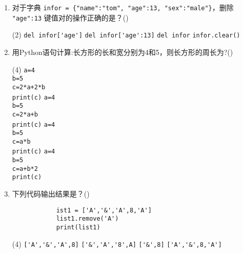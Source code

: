 \documentclass[11pt]{ctexart}
\begin{document}
    \begin{enumerate}
        \item 对于字典 \lstinline!infor = {"name":"tom", "age":13, "sex":"male"}!，删除 \lstinline!"age":13! 键值对的操作正确的是？(\qquad)
        \begin{tasks}(2)
            \task \lstinline!del infor['age']!
            \task \lstinline!del infor['age':13]!
            \task \lstinline!del infor!
            \task \lstinline!infor.clear()!
        \end{tasks}

        \item 用Python语句计算:长方形的长和宽分别为4和5，则长方形的周长为?(\qquad)
        \begin{tasks}(4)
            \task \lstinline!a=4!\\\lstinline!b=5!\\\lstinline!c=2*a+2*b!\\\lstinline!print(c)!
            \task \lstinline!a=4!\\\lstinline!b=5!\\\lstinline!c=2*a+b!\\\lstinline!print(c)!
            \task \lstinline!a=4!\\\lstinline!b=5!\\\lstinline!c=a*b!\\\lstinline!print(c)!
            \task \lstinline!a=4!\\\lstinline!b=5!\\\lstinline!c=a+b*2!\\\lstinline!print(c)!
        \end{tasks}

        \item 下列代码输出结果是？(\qquad)
        \begin{lstlisting}
            ist1 = ['A','&','A',8,'A']
            list1.remove('A')
            print(list1)
        \end{lstlisting}
        \begin{tasks}(4)
            \task \lstinline!['A','&','A',8]!
            \task \lstinline!['&','A','8',A]!
            \task \lstinline!['&',8]!
            \task \lstinline!['A','&',8,'A']!
        \end{tasks}


\end{enumerate}
\end{document}
